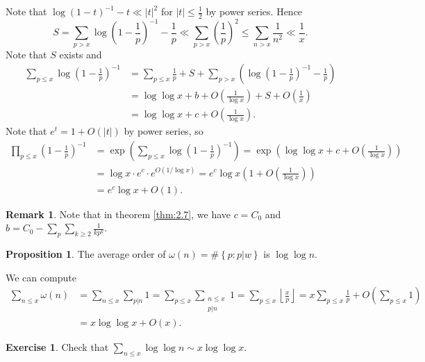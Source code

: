\documentclass[11pt]{article}
\theoremstyle{definition}
\newtheorem{exe}[thm]{Exercise}
\newtheorem{prop}[thm]{Proposition}
\newtheorem{remark}[thm]{Remark}
\newcommand{\set}[1]{\left\{ #1 \right\}}
\newcommand{\floor}[1]{\left\lfloor #1 \right\rfloor}
\newcommand{\abs}[1]{\left\lvert#1\right\rvert} %
\begin{document}
\proof[Proof of (e)]
Note that $\log(1-t)^{-1}-t\ll\abs{t}^2$ for $\abs{t}\le\frac12$ by power series. Hence
\[
S = \sum_{p>x}\log\left(1-\frac1p\right)^{-1}-\frac1p
\ll \sum_{p>x}\left(\frac1p\right)^2 \le \sum_{n>x}\frac1{n^2}
\ll \frac1x .
\]
Note that $S$ exists and
\begin{align*}
\sum_{p\le x}\log\left(1-\frac1p\right)^{-1}
&= \sum_{p\le x}\frac1p + S
+ \sum_{p>x}\left(\log\left(1-\frac1p\right)^{-1}-\frac1p\right) \\
&= \log\log x + b + O\left(\frac1{\log x}\right) + S + O\left(\frac1x\right) \\
&= \log\log x + c + O\left(\frac1{\log x}\right) .
\end{align*}
Note that $e^t=1+O\left(\abs{t}\right)$ by power series, so
\begin{align*}
\prod_{p\le x}\left(1-\frac1p\right)^{-1}
&= \exp\left(\sum_{p\le x}\log\left(1-\frac1p\right)^{-1}\right)
= \exp\left(\log\log x + c + O\left(\frac1{\log x}\right)\right) \\
&= \log x \cdot e^c \cdot e^{O\left(1/\log x\right)}
= e^c\log x\left(1 + O\left(\frac1{\log x}\right)\right) \\
&= e^c\log x + O(1) .
\end{align*}
\qedhere

\begin{remark}
Note that in theorem \ref{thm:2.7}, we have $c=C_0$ and
$b=C_0-\sum_p\sum_{k\ge2}\frac1{kp^k}$.
\end{remark}

\begin{prop}
The average order of $\omega(n)=\#\set{p:p|w}$ is $\log\log n$.
\end{prop}
\proof
We can compute
\begin{align*}
\sum_{n\le x}\omega(n) &= \sum_{n\le x}\sum_{p|n}1
= \sum_{p\le x}\sum_{\substack{n\le x\\p|n}}1
= \sum_{p\le x}\floor{\frac{x}p}
= x\sum_{p\le x}\frac1p + O\left(\sum_{p\le x}1\right) \\
&= x\log\log x + O(x) .
\end{align*}
\qedhere

\begin{exe}
Check that $\sum_{n\le x}\log\log n \sim x\log\log x$.
\end{exe}

\end{document}
